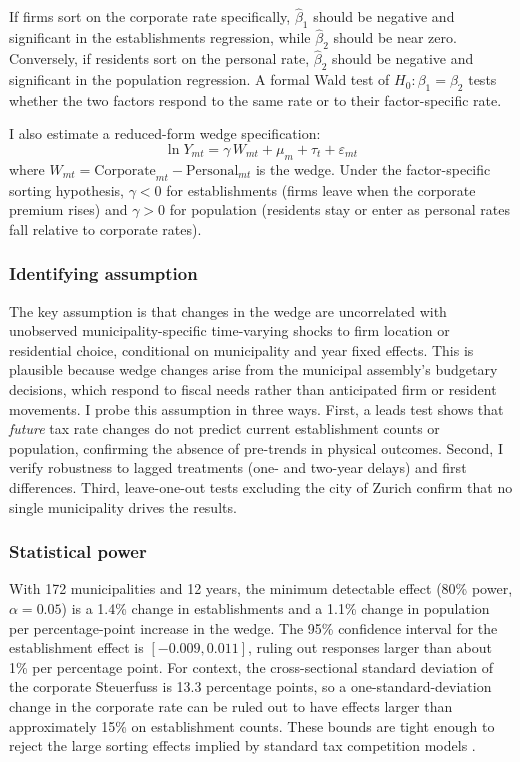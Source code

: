 \documentclass[12pt]{article}
\begin{document}
If firms sort on the corporate rate specifically, $\hat{\beta}_1$ should be negative and significant in the establishments regression, while $\hat{\beta}_2$ should be near zero. Conversely, if residents sort on the personal rate, $\hat{\beta}_2$ should be negative and significant in the population regression. A formal Wald test of $H_0: \beta_1 = \beta_2$ tests whether the two factors respond to the same rate or to their factor-specific rate.

I also estimate a reduced-form wedge specification:
\begin{equation}
\ln Y_{mt} = \gamma \, W_{mt} + \mu_m + \tau_t + \varepsilon_{mt}
\label{eq:wedge}
\end{equation}
where $W_{mt} = \text{Corporate}_{mt} - \text{Personal}_{mt}$ is the wedge. Under the factor-specific sorting hypothesis, $\gamma < 0$ for establishments (firms leave when the corporate premium rises) and $\gamma > 0$ for population (residents stay or enter as personal rates fall relative to corporate rates).

\subsubsection*{Identifying assumption} The key assumption is that changes in the wedge are uncorrelated with unobserved municipality-specific time-varying shocks to firm location or residential choice, conditional on municipality and year fixed effects. This is plausible because wedge changes arise from the municipal assembly's budgetary decisions, which respond to fiscal needs rather than anticipated firm or resident movements. I probe this assumption in three ways. First, a leads test shows that \textit{future} tax rate changes do not predict current establishment counts or population, confirming the absence of pre-trends in physical outcomes. Second, I verify robustness to lagged treatments (one- and two-year delays) and first differences. Third, leave-one-out tests excluding the city of Zurich confirm that no single municipality drives the results.

\subsubsection*{Statistical power} With 172 municipalities and 12 years, the minimum detectable effect (80\% power, $\alpha = 0.05$) is a 1.4\% change in establishments and a 1.1\% change in population per percentage-point increase in the wedge. The 95\% confidence interval for the establishment effect is $[-0.009, 0.011]$, ruling out responses larger than about 1\% per percentage point. For context, the cross-sectional standard deviation of the corporate Steuerfuss is 13.3 percentage points, so a one-standard-deviation change in the corporate rate can be ruled out to have effects larger than approximately 15\% on establishment counts. These bounds are tight enough to reject the large sorting effects implied by standard tax competition models \citep{giroud2019}.
\end{document}
